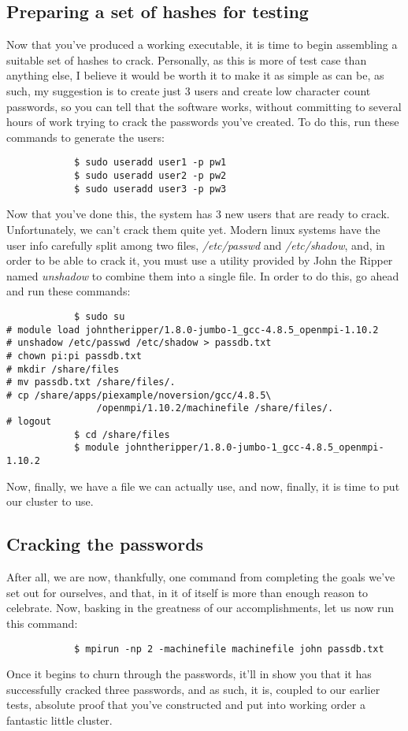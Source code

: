 \documentclass[]{article}
\begin{document}
            \subsection{Preparing a set of hashes for testing}
            Now that you've produced a working executable, it is time to begin assembling a suitable set of hashes to 
            crack. Personally, as this is more of test case than anything else, I believe it would be worth it to make 
            it as simple as can be, as such, my suggestion is to create just 3 users and create low character count 
            passwords, so you can tell that the software works, without committing to several hours of work trying to 
            crack the passwords you've created. To do this, run these commands to generate the users:
            \begin{lstlisting}
            $ sudo useradd user1 -p pw1
            $ sudo useradd user2 -p pw2
            $ sudo useradd user3 -p pw3
            \end{lstlisting}
            Now that you've done this, the system has 3 new users that are ready to crack. Unfortunately, we can't
            crack them quite yet. Modern linux systems have the user info carefully split among two files, 
            \textit{/etc/passwd} and \textit{/etc/shadow}, and, in order to be able to crack it, you must use a utility 
            provided by John the Ripper named \textit{unshadow} to combine them into a single file. In order to do 
            this, go ahead and run these commands: 
            \begin{lstlisting}
            $ sudo su
# module load johntheripper/1.8.0-jumbo-1_gcc-4.8.5_openmpi-1.10.2
# unshadow /etc/passwd /etc/shadow > passdb.txt
# chown pi:pi passdb.txt
# mkdir /share/files
# mv passdb.txt /share/files/.
# cp /share/apps/piexample/noversion/gcc/4.8.5\
                /openmpi/1.10.2/machinefile /share/files/.
# logout
            $ cd /share/files
            $ module johntheripper/1.8.0-jumbo-1_gcc-4.8.5_openmpi-1.10.2
            \end{lstlisting}
            Now, finally, we have a file we can actually use, and now, finally, it is time to put our cluster to use.

            \subsection{Cracking the passwords}
            After all, we are now, thankfully, one command from completing the goals we've set out for ourselves, and 
            that, in it of itself is more than enough reason to celebrate. Now, basking in the greatness of our 
            accomplishments, let us now run this command:
            \begin{lstlisting}
            $ mpirun -np 2 -machinefile machinefile john passdb.txt
            \end{lstlisting}
            Once it begins to churn through the passwords, it'll in show you that it has successfully cracked three 
            passwords, and as such, it is, coupled to our earlier tests, absolute proof that you've constructed and put 
            into working order a fantastic little cluster.
\end{document}
